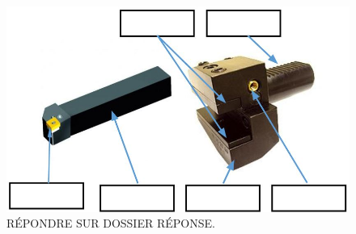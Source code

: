\documentclass[12pt]{article}
\begin{document}
\begin{figure}
\centering
\includegraphics[width=0.8\linewidth]{Images/PP1.JPG}
\caption{RÉPONDRE SUR DOSSIER RÉPONSE.}
\label{PP1}
\end{figure}
\end{document}
